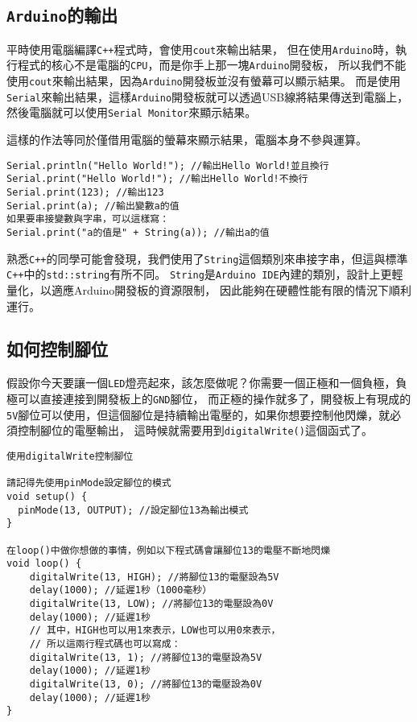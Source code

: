 \documentclass[12pt,a4paper]{article}
\begin{document}
\subsection{\texttt{Arduino}的輸出}
平時使用電腦編譯\texttt{C++}程式時，會使用\texttt{cout}來輸出結果，
但在使用\texttt{Arduino}時，執行程式的核心不是電腦的\texttt{CPU}，而是你手上那一塊\texttt{Arduino}開發板，
所以我們不能使用\texttt{cout}來輸出結果，因為\texttt{Arduino}開發板並沒有螢幕可以顯示結果。
而是使用\texttt{Serial}來輸出結果，這樣\texttt{Arduino}開發板就可以透過USB線將結果傳送到電腦上，
然後電腦就可以使用\texttt{Serial Monitor}來顯示結果。

這樣的作法等同於僅借用電腦的螢幕來顯示結果，電腦本身不參與運算。

\begin{lstlisting}
Serial.println("Hello World!"); //輸出Hello World!並且換行
Serial.print("Hello World!"); //輸出Hello World!不換行
Serial.print(123); //輸出123
Serial.print(a); //輸出變數a的值
如果要串接變數與字串，可以這樣寫：
Serial.print("a的值是" + String(a)); //輸出a的值
\end{lstlisting}

熟悉\texttt{C++}的同學可能會發現，我們使用了\texttt{String}這個類別來串接字串，但這與標準\texttt{C++}中的\texttt{std::string}有所不同。
\texttt{String}是\texttt{Arduino IDE}內建的類別，設計上更輕量化，以適應Arduino開發板的資源限制，
因此能夠在硬體性能有限的情況下順利運行。

\subsection{如何控制腳位}
假設你今天要讓一個\texttt{LED}燈亮起來，該怎麼做呢？你需要一個正極和一個負極，負極可以直接連接到開發板上的\texttt{GND}腳位，
而正極的操作就多了，開發板上有現成的\texttt{5V}腳位可以使用，但這個腳位是持續輸出電壓的，如果你想要控制他閃爍，就必須控制腳位的電壓輸出，
這時候就需要用到\texttt{digitalWrite()}這個函式了。
\begin{lstlisting}    
使用digitalWrite控制腳位

請記得先使用pinMode設定腳位的模式
void setup() {
  pinMode(13, OUTPUT); //設定腳位13為輸出模式
}

在loop()中做你想做的事情，例如以下程式碼會讓腳位13的電壓不斷地閃爍
void loop() {
    digitalWrite(13, HIGH); //將腳位13的電壓設為5V
    delay(1000); //延遲1秒（1000毫秒）
    digitalWrite(13, LOW); //將腳位13的電壓設為0V 
    delay(1000); //延遲1秒
    // 其中，HIGH也可以用1來表示，LOW也可以用0來表示，
    // 所以這兩行程式碼也可以寫成：
    digitalWrite(13, 1); //將腳位13的電壓設為5V
    delay(1000); //延遲1秒
    digitalWrite(13, 0); //將腳位13的電壓設為0V    
    delay(1000); //延遲1秒
}
\end{lstlisting}
\end{document}
